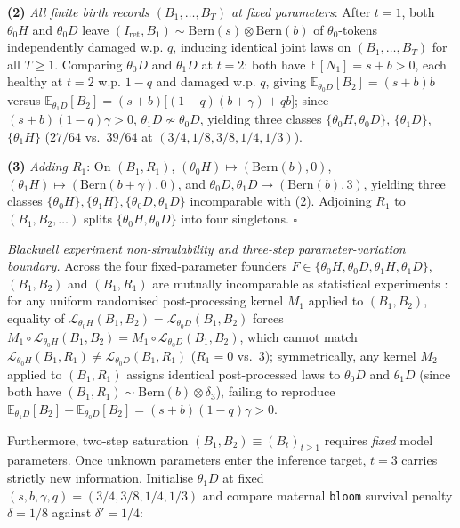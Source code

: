 \documentclass[12pt,letterpaper]{article}
\begin{document}
\textbf{(2)} \emph{All finite birth records \((B_1,\dots,B_T)\) at fixed
parameters}: After \(t=1\), both \(\theta_0 H\) and \(\theta_0 D\) leave
\((I_{\mathrm{ret}}, B_1) \sim \mathrm{Bern}(s) \otimes \mathrm{Bern}(b)\)
of \(\theta_0\)-tokens independently damaged w.p. \(q\), inducing
identical joint laws on \((B_1, \dots, B_T)\) for all \(T \ge 1\).
Comparing \(\theta_0 D\) and \(\theta_1 D\) at \(t=2\): both have
\(\mathbb{E}[N_1] = s + b > 0\), each healthy at \(t=2\) w.p. \(1-q\)
and damaged w.p. \(q\), giving \(\mathbb{E}_{\theta_0 D}[B_2] = (s+b)b\)
versus
\(\mathbb{E}_{\theta_1 D}[B_2] = (s+b)\bigl[(1-q)(b+\gamma) + q b\bigr]\);
since \((s+b)(1-q)\gamma > 0\), \(\theta_1 D \not\sim \theta_0 D\),
yielding three classes \(\{\theta_0 H, \theta_0 D\}\),
\(\{\theta_1 D\}\), \(\{\theta_1 H\}\) (\(27/64\) vs.~\(39/64\) at
\((3/4, 1/8, 3/8, 1/4, 1/3)\)).

\textbf{(3)} \emph{Adding \(R_1\)}: On \((B_1, R_1)\),
\((\theta_0 H) \mapsto (\mathrm{Bern}(b), 0)\),
\((\theta_1 H) \mapsto (\mathrm{Bern}(b+\gamma), 0)\), and
\(\theta_0 D, \theta_1 D \mapsto (\mathrm{Bern}(b), 3)\), yielding three
classes \(\{\theta_0 H\}, \{\theta_1 H\}, \{\theta_0 D, \theta_1 D\}\)
incomparable with (2). Adjoining \(R_1\) to \((B_1, B_2, \dots)\) splits
\(\{\theta_0 H, \theta_0 D\}\) into four singletons. \(\square\)

\emph{Blackwell experiment non-simulability and three-step
parameter-variation boundary.} Across the four fixed-parameter founders
\(F \in \{\theta_0 H, \theta_0 D, \theta_1 H, \theta_1 D\}\),
\((B_1, B_2)\) and \((B_1, R_1)\) are mutually incomparable as
statistical experiments \citep{blackwell1953, barnettCrutchfield2015}:
for any uniform randomised post-processing kernel \(M_1\) applied to
\((B_1, B_2)\), equality of
\(\mathcal{L}_{\theta_0 H}(B_1, B_2) = \mathcal{L}_{\theta_0 D}(B_1, B_2)\)
forces
\(M_1 \circ \mathcal{L}_{\theta_0 H}(B_1, B_2) = M_1 \circ \mathcal{L}_{\theta_0 D}(B_1, B_2)\),
which cannot match
\(\mathcal{L}_{\theta_0 H}(B_1, R_1) \neq \mathcal{L}_{\theta_0 D}(B_1, R_1)\)
(\(R_1 = 0\) vs.~\(3\)); symmetrically, any kernel \(M_2\) applied to
\((B_1, R_1)\) assigns identical post-processed laws to \(\theta_0 D\)
and \(\theta_1 D\) (since both have
\((B_1, R_1) \sim \mathrm{Bern}(b) \otimes \delta_3\)), failing to
reproduce
\(\mathbb{E}_{\theta_1 D}[B_2] - \mathbb{E}_{\theta_0 D}[B_2] = (s+b)(1-q)\gamma > 0\).

Furthermore, two-step saturation \((B_1, B_2) \equiv (B_t)_{t\ge 1}\)
requires \emph{fixed} model parameters. Once unknown parameters enter
the inference target, \(t=3\) carries strictly new information.
Initialise \(\theta_1 D\) at fixed
\((s, b, \gamma, q) = (3/4, 3/8, 1/4, 1/3)\) and compare maternal
\texttt{bloom} survival penalty \(\delta = 1/8\) against
\(\delta' = 1/4\):
\end{document}
